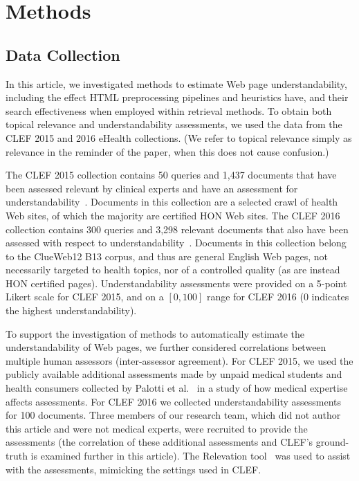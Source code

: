 \section*{Methods}
\label{sec:data}

\subsection{Data Collection}

In this article, we investigated methods to estimate Web page understandability, including the effect HTML preprocessing pipelines and heuristics have, and their search effectiveness when employed within retrieval methods. To obtain both topical relevance and  understandability assessments, we used the data from the CLEF 2015 and 2016 eHealth collections. (We refer to topical relevance simply as relevance in the reminder of the paper, when this does not cause confusion.)

The CLEF 2015 collection contains 50 queries and 1,437 documents that have been assessed relevant by clinical experts and have an assessment for understandability~\cite{clef15}. Documents in this collection are a selected crawl of health Web sites, of which the majority are certified HON Web sites.
The CLEF 2016 collection contains 300 queries and 3,298 relevant documents that also have been assessed with respect to understandability~\cite{clef16}. Documents in this collection belong to the ClueWeb12 B13 corpus, and thus are general English Web pages, not necessarily targeted to health topics, nor of a controlled quality (as are instead HON certified pages). 
Understandability assessments were provided on a 5-point Likert scale for CLEF 2015, and on a $[0,100]$ range for CLEF 2016 (0 indicates the highest understandability). 

To support the investigation of methods to automatically estimate the understandability of Web pages, 
we further considered correlations between multiple human assessors (inter-assessor agreement). For CLEF 2015, we used the publicly available additional assessments made by unpaid medical students and health consumers collected by Palotti et al.~\cite{palotti16b} in a study of how medical expertise affects assessments. For CLEF 2016 we  collected understandability assessments for 100 documents. 
Three members of our research team, which did not author this article and were not medical experts, were recruited to provide the assessments (the correlation of these additional assessments and CLEF's ground-truth is examined further in this article).
The Relevation tool~\cite{koopman14} was used to assist with the assessments, mimicking the settings used in CLEF. %

